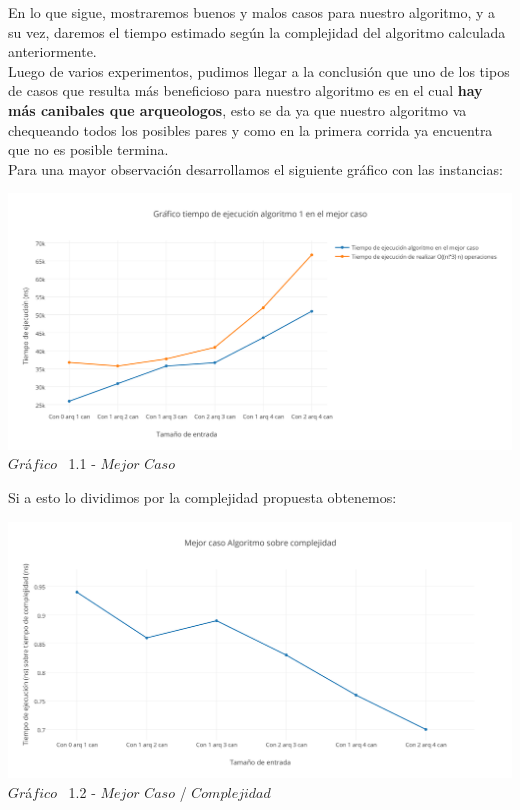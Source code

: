 \indent En lo que sigue, mostraremos buenos y malos casos para nuestro algoritmo, y a su vez, daremos el tiempo estimado 
seg\'un la complejidad del algoritmo calculada anteriormente.\\

Luego de varios experimentos, pudimos llegar a la conclusi\'on que uno de los tipos de casos que resulta m\'as beneficioso para nuestro algoritmo
es en el cual \textbf{hay m\'as canibales que arqueologos}, esto se da ya que nuestro algoritmo va chequeando todos los posibles pares y como en la primera corrida ya encuentra que no es posible termina.\\

Para una mayor observaci\'on desarrollamos el siguiente gr\'afico con las instancias:\\

\vspace*{0.3cm} \vspace*{0.3cm}
  \begin{center}
 \includegraphics[scale=0.65]{./EJ1/mejorcasoej1.png}
 {$Gr$\'a$fico$ \ 1.1 - $Mejor$ $Caso$}
  \end{center}
  \vspace*{0.3cm}


Si a esto lo dividimos por la complejidad propuesta obtenemos:\\

\vspace*{0.3cm} \vspace*{0.3cm}
  \begin{center}
 \includegraphics[scale=0.65]{./EJ1/mejorcasoej11.png}
 {$Gr$\'a$fico$ \ 1.2 - $Mejor$ $Caso$ / $Complejidad$}
  \end{center}
  \vspace*{0.3cm}

